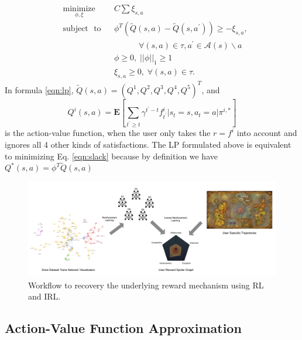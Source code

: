 \documentclass{sigchi}
\begin{document}
\begin{equation}
\begin{aligned}
& \underset{\phi, \xi}{\mathrm{minimize}}
& & C\sum \xi_{s,a} \\
& \mathrm{subject}\text{ }\mathrm{to}
& & \phi^T(\tilde{Q}(s,a)-\tilde{Q}(s,a^\prime)) \geq - \xi_{s,a}, \\
&&& \quad\quad\quad \forall (s,a) \in \tau, a^\prime \in \mathcal{A}(s)\backslash a \\
&&& \phi \geq 0, \; ||\phi||_1\geq 1\\
&&& \xi_{s,a} \geq 0, \; \forall (s,a) \in \tau. 
\label{eqn:lp}
\end{aligned}
\end{equation}
In formula \eqref{eqn:lp}, $\tilde{Q}(s,a)=(Q^1,Q^2,Q^3,Q^4,Q^5)^T$, and
\begin{equation}
Q^i(s,a)=\mathbf{E}[\sum_{t^\prime\geq t}\gamma^{t^\prime-t}f^i_{t^\prime} | s_{t}=s, a_{t}=a | \pi^{i,\ast}] \label{eqn:qi}
\end{equation}
is the action-value function, when the user only takes the $r=f^i$ into account and ignores all 4 other kinds of satisfactions.
The LP formulated above is equivalent to minimizing Eq. \eqref{eqn:slack} because by definition we have $Q^*(s,a)=\phi^T\tilde{Q}(s,a)$

\begin{figure}[t]
  \centering
  \includegraphics[width=\textwidth]{figs/workflow.png}
  \caption{Workflow to recovery the underlying reward mechanism using RL and IRL.}
  \label{fig:workflow}
\end{figure}

\subsection{Action-Value Function Approximation}
\end{document}
